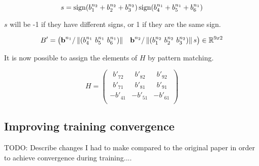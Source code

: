 \[
s = \operatorname{sign}(b^{n_2}_1 + b^{n_2}_2 + b^{n_2}_3) \operatorname{sign}(b^{n_1}_4 + b^{n_1}_5 + b^{n_1}_6)
\]

$s$ will be -1 if they have different signs, or 1 if they are the same sign.

\[
B'=
\begin{pmatrix}
\textbf{b}^{n_1} / \left\lVert(b^{n_1}_4 \ b^{n_1}_5 \ b^{n_1}_6)
\right\rVert &
\textbf{b}^{n_2} / \left\lVert(b^{n_2}_1 \ b^{n_2}_2 \ b^{n_2}_3)\right\rVert s
\end{pmatrix}
\in \mathbb{R}^{9x2}
\]

It is now possible to assign the elements of $H$ by pattern matching.

\[
H=
\begin{pmatrix}
\ \ b'_{72} & \ \ b'_{82} & \ \ b'_{92} \\
\ \ b'_{71} & \ \ b'_{81} & \ \ b'_{91} \\
-b'_{41} & -b'_{51} & -b'_{61} \\
\end{pmatrix}
\]

\subsection{Improving training convergence}

TODO: Describe changes I had to make compared to the original paper in order to achieve convergence during training....